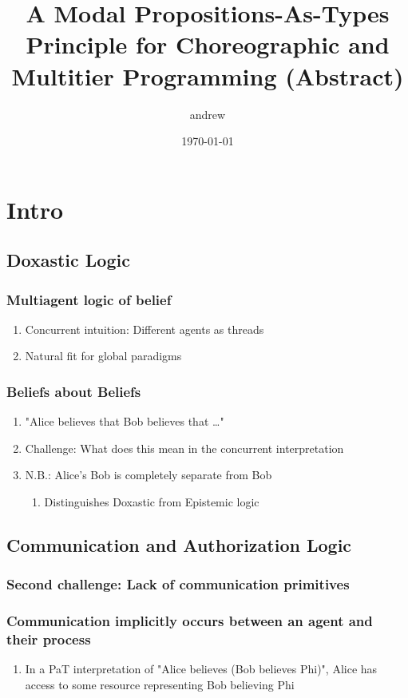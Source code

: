 \documentclass[11pt]{article}
\author{andrew}
\date{\today}
\title{A Modal Propositions-As-Types Principle for Choreographic and Multitier Programming (Abstract)}
\begin{document}
\maketitle
\section{Intro}
\label{sec:org8839bf9}
\subsection{Doxastic Logic}
\label{sec:org49027b7}
\subsubsection{Multiagent logic of belief}
\label{sec:org9ad7d93}
\begin{enumerate}
\item Concurrent intuition: Different agents as threads
\label{sec:orgd4c2ff0}
\item Natural fit for global paradigms
\label{sec:orga8c94b1}
\end{enumerate}
\subsubsection{Beliefs about Beliefs}
\label{sec:orgf630f60}
\begin{enumerate}
\item "Alice believes that Bob believes that \ldots{}"
\label{sec:org210190b}
\item Challenge: What does this mean in the concurrent interpretation
\label{sec:org280adc7}
\item N.B.: Alice's Bob is completely separate from Bob
\label{sec:org5f5c407}
\begin{enumerate}
\item Distinguishes Doxastic from Epistemic logic
\label{sec:org8d9d976}
\end{enumerate}
\end{enumerate}
\subsection{Communication and Authorization Logic}
\label{sec:org9a7b937}
\subsubsection{Second challenge: Lack of communication primitives}
\label{sec:org4c8cbb8}
\subsubsection{Communication implicitly occurs between an agent and their process}
\label{sec:orgaddfc7d}
\begin{enumerate}
\item In a PaT interpretation of "Alice believes (Bob believes Phi)", Alice has access to some resource representing Bob believing Phi
\label{sec:org931eeb1}
\end{enumerate}
\end{document}
